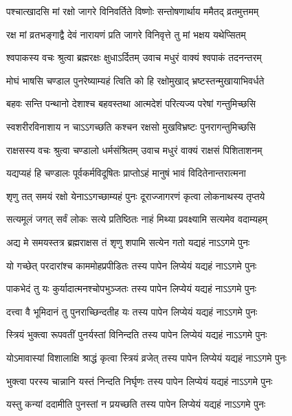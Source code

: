 \twolineshloka
{पश्चात्खादसि मां रक्षो जागरे विनिवर्तिते}
{विष्णोः सन्तोषणार्थाय ममैतद् व्रतमुत्तमम्}%

\twolineshloka
{रक्ष मां व्रतभङ्गाद्वै देवं नारायणं प्रति}
{जागरे विनिवृत्ते तु मां भक्षय यथेप्सितम्}%

\twolineshloka
{श्वपाकस्य वचः श्रुत्वा ब्रह्मरक्षः क्षुधाऽर्दितम्}
{उवाच मधुरं वाक्यं श्वपाकं तदनन्तरम्}%

\twolineshloka
{मोघं भाषसि चण्डाल पुनरेष्याम्यहं त्विति}
{को हि रक्षोमुखाद् भ्रष्टस्तन्मुखायाभिवर्धते}%

\twolineshloka
{बहवः सन्ति पन्थानो देशाश्च बहवस्तथा}
{आत्मदेशं परित्यज्य परेषां गन्तुमिच्छसि}%

\twolineshloka
{स्वशरीरविनाशाय न चाऽऽगच्छति कश्चन}
{रक्षसो मुखविभ्रष्टः पुनरागन्तुमिच्छसि}%

\twolineshloka
{राक्षसस्य वचः श्रुत्वा चण्डालो धर्मसंश्रितम्}
{उवाच मधुरं वाक्यं राक्षसं पिशिताशनम्}%

\twolineshloka
{यद्यप्यहं हि चण्डालः पूर्वकर्मविदूषितः}
{प्राप्तोऽहं मानुषं भावं विदितेनान्तरात्मना}%

\twolineshloka
{शृणु तत् समयं रक्षो येनाऽऽगच्छाम्यहं पुनः}
{दूराज्जागरणं कृत्वा लोकनाथस्य तृप्तये}%

\twolineshloka
{सत्यमूलं जगत् सर्वं लोकः सत्ये प्रतिष्ठितः}
{नाहं मिथ्या प्रवक्ष्यामि सत्यमेव वदाम्यहम्}%

\twolineshloka
{अद्य मे समयस्तत्र ब्रह्मराक्षस तं शृणु}
{शपामि सत्येन गतो यद्यहं नाऽऽगमे पुनः}%

\twolineshloka
{यो गच्छेत् परदारांश्च काममोहप्रपीडितः}
{तस्य पापेन लिप्येयं यद्यहं नाऽऽगमे पुनः}%

\twolineshloka
{पाकभेदं तु यः कुर्यादात्मनश्चोपभुञ्जतः}
{तस्य पापेन लिप्येयं यद्यहं नाऽऽगमे पुनः}%

\twolineshloka
{दत्त्वा वै भूमिदानं तु पुनराच्छिन्दतीह यः}
{तस्य पापेन लिप्येयं यद्यहं नाऽऽगमे पुनः}%

\twolineshloka
{स्त्रियं भुक्त्वा रूपवतीं पुनर्यस्तां विनिन्दति}
{तस्य पापेन लिप्येयं यद्यहं नाऽऽगमे पुनः}%

\twolineshloka
{योऽमावास्यां विशालाक्षि श्राद्धं कृत्वा स्त्रियं व्रजेत्}
{तस्य पापेन लिप्येयं यद्यहं नाऽऽगमे पुनः}%

\twolineshloka
{भुक्त्वा परस्य चान्नानि यस्तं निन्दति निर्घृणः}
{तस्य पापेन लिप्येयं यद्यहं नाऽऽगमे पुनः}%

\twolineshloka
{यस्तु कन्यां ददामीति पुनस्तां न प्रयच्छति}
{तस्य पापेन लिप्येयं यद्यहं नाऽऽगमे पुनः}%

